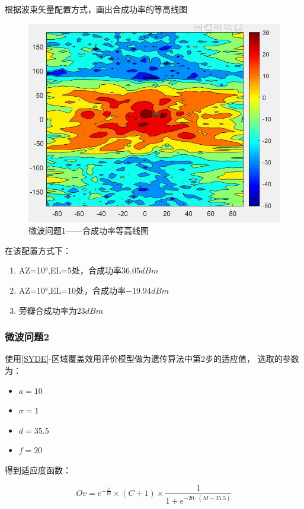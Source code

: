 \documentclass[UTF8,12pt]{ctexart}
\begin{document}
根据波束矢量配置方式，画出合成功率的等高线图
\begin{figure}[H]
    \centering
    \includegraphics[scale=0.45]{h1.jpg}
    \caption{微波问题1——合成功率等高线图}
\end{figure}
在该配置方式下：\begin{enumerate}
    \item AZ=10°,EL=5处，合成功率$36.05dBm $
    \item AZ=10°,EL=10处，合成功率$-19.94dBm$
    \item 旁瓣合成功率为$23dBm$
\end{enumerate}



\subsubsection{微波问题2}
使用\ref{SYDE}-区域覆盖效用评价模型做为遗传算法中第2步的适应值，
选取的参数为：
\begin{itemize}
    \item $a=10$
    \item $σ = 1$
    \item $d=35.5$
    \item $f=20$
\end{itemize}

得到适应度函数：
\begin{large}
    $$Ov = e^{-\frac {D}{10}}×(C+1)×\frac {1}{1+e^{-20·(M-35.5)}}$$
\end{large}
\end{document}
